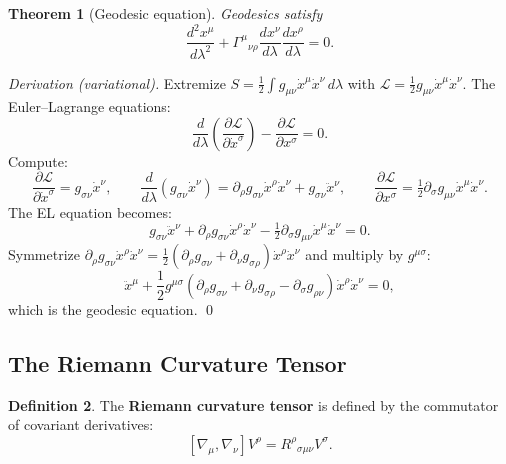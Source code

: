 \documentclass[12pt,a4paper]{article}
\theoremstyle{plain}
\newtheorem{theorem}{Theorem}[section]
\theoremstyle{definition}
\newtheorem{definition}[theorem]{Definition}
\theoremstyle{remark}
\begin{document}
\begin{theorem}[Geodesic equation]\label{thm:geodesic}
Geodesics satisfy
\[
  \frac{d^2x^\mu}{d\lambda^2} + \Gamma^\mu{}_{\nu\rho}\frac{dx^\nu}{d\lambda}\frac{dx^\rho}{d\lambda} = 0.
\]
\end{theorem}
\begin{proof}[Derivation (variational)]
Extremize $S = \tfrac{1}{2}\int g_{\mu\nu}\dot x^\mu\dot x^\nu\,d\lambda$ with $\mathcal{L}=\tfrac{1}{2}g_{\mu\nu}\dot x^\mu\dot x^\nu$. The Euler--Lagrange equations:
\[
  \frac{d}{d\lambda}\!\left(\frac{\partial\mathcal{L}}{\partial\dot x^\sigma}\right) - \frac{\partial\mathcal{L}}{\partial x^\sigma} = 0.
\]
Compute:
\[
  \frac{\partial\mathcal{L}}{\partial\dot x^\sigma} = g_{\sigma\nu}\dot x^\nu,
  \qquad
  \frac{d}{d\lambda}(g_{\sigma\nu}\dot x^\nu) = \partial_\rho g_{\sigma\nu}\dot x^\rho\dot x^\nu + g_{\sigma\nu}\ddot x^\nu,
  \qquad
  \frac{\partial\mathcal{L}}{\partial x^\sigma} = \tfrac{1}{2}\partial_\sigma g_{\mu\nu}\dot x^\mu\dot x^\nu.
\]
The EL equation becomes:
\[
  g_{\sigma\nu}\ddot x^\nu + \partial_\rho g_{\sigma\nu}\dot x^\rho\dot x^\nu - \tfrac{1}{2}\partial_\sigma g_{\mu\nu}\dot x^\mu\dot x^\nu = 0.
\]
Symmetrize $\partial_\rho g_{\sigma\nu}\dot x^\rho\dot x^\nu = \tfrac{1}{2}(\partial_\rho g_{\sigma\nu}+\partial_\nu g_{\sigma\rho})\dot x^\rho\dot x^\nu$ and multiply by $g^{\mu\sigma}$:
\[
  \ddot x^\mu + \frac{1}{2}g^{\mu\sigma}(\partial_\rho g_{\sigma\nu}+\partial_\nu g_{\sigma\rho}-\partial_\sigma g_{\rho\nu})\dot x^\rho\dot x^\nu = 0,
\]
which is the geodesic equation. \qed
\end{proof}

\subsection{The Riemann Curvature Tensor}

\begin{definition}
The \textbf{Riemann curvature tensor} is defined by the commutator of covariant derivatives:
\[
  [\nabla_\mu,\nabla_\nu]V^\rho = R^\rho{}_{\sigma\mu\nu}V^\sigma.
\]
\end{definition}
\end{document}
